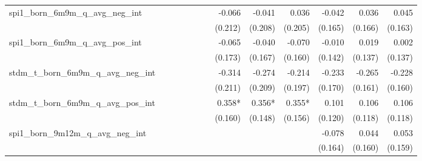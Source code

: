 \begin{tabular}{lrrrrrrrrrrrr}
spi1\_born\_6m9m\_q\_avg\_neg\_int          &              &              &              &              &              &              &       -0.066 &       -0.041 &        0.036 &       -0.042 &        0.036 &        0.045 \\ 
                                            &              &              &              &              &              &              &      (0.212) &      (0.208) &      (0.205) &      (0.165) &      (0.166) &      (0.163) \\ 
spi1\_born\_6m9m\_q\_avg\_pos\_int          &              &              &              &              &              &              &       -0.065 &       -0.040 &       -0.070 &       -0.010 &        0.019 &        0.002 \\ 
                                            &              &              &              &              &              &              &      (0.173) &      (0.167) &      (0.160) &      (0.142) &      (0.137) &      (0.137) \\ 
stdm\_t\_born\_6m9m\_q\_avg\_neg\_int       &              &              &              &              &              &              &       -0.314 &       -0.274 &       -0.214 &       -0.233 &       -0.265 &       -0.228 \\ 
                                            &              &              &              &              &              &              &      (0.211) &      (0.209) &      (0.197) &      (0.170) &      (0.161) &      (0.160) \\ 
stdm\_t\_born\_6m9m\_q\_avg\_pos\_int       &              &              &              &              &              &              &       0.358* &       0.356* &       0.355* &        0.101 &        0.106 &        0.106 \\ 
                                            &              &              &              &              &              &              &      (0.160) &      (0.148) &      (0.156) &      (0.120) &      (0.118) &      (0.118) \\ 
spi1\_born\_9m12m\_q\_avg\_neg\_int         &              &              &              &              &              &              &              &              &              &       -0.078 &        0.044 &        0.053 \\ 
                                            &              &              &              &              &              &              &              &              &              &      (0.164) &      (0.160) &      (0.159) \\ 

\end{tabular}
